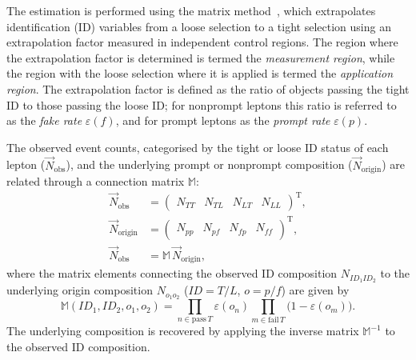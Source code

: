 The estimation is performed using the matrix method~\cite{D0MtxMethod,CMSFRMethod}, which extrapolates identification (ID) variables from a loose selection to a tight selection using an extrapolation factor measured in independent control regions. The region where the extrapolation factor is determined is termed the \textit{measurement region}, while the region with the loose selection where it is applied is termed the \textit{application region}. The extrapolation factor is defined as the ratio of objects passing the tight ID to those passing the loose ID; for nonprompt leptons this ratio is referred to as the \textit{fake rate} $\varepsilon(f)$, and for prompt leptons as the \textit{prompt rate} $\varepsilon(p)$.

The observed event counts, categorised by the tight or loose ID status of each lepton ($\vec{N}_{\text{obs}}$), and the underlying prompt or nonprompt composition ($\vec{N}_{\text{origin}}$) are related through a connection matrix $\mathbb{M}$:
\begin{align}
  \vec{N}_{\text{obs}}    &= \left( \begin{array}{cccc}N_{TT} & N_{TL} & N_{LT} & N_{LL}\end{array} \right)^{\mathrm{T}}, \nonumber \\
  \vec{N}_{\text{origin}} &= \left( \begin{array}{cccc}N_{pp} & N_{pf} & N_{fp} & N_{ff}\end{array} \right)^{\mathrm{T}}, \nonumber \\
  \vec{N}_{\text{obs}}    &= \mathbb{M}\,\vec{N}_{\text{origin}},
  \label{eq:matrix_method}
\end{align}
where the matrix elements connecting the observed ID composition $N_{ID_{1}ID_{2}}$ to the underlying origin composition $N_{o_{1}o_{2}}$ ($ID = T/L$, $o = p/f$) are given by
\begin{equation}
  \mathbb{M}(ID_{1},ID_{2},o_{1},o_{2}) = \prod_{n\in\text{pass}\,T}\varepsilon(o_{n})\prod_{m\in\text{fail}\,T}\bigl(1-\varepsilon(o_{m})\bigr).
  \label{eq:connection_matrix}
\end{equation}
The underlying composition is recovered by applying the inverse matrix $\mathbb{M}^{-1}$ to the observed ID composition.


